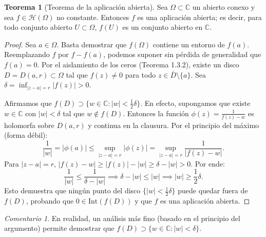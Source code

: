 \documentclass[11pt,a4paper]{article}
\theoremstyle{definition}
\newtheorem{teorema}{Teorema}[section]
\theoremstyle{remark}
\newtheorem{observacion}{Comentario}[section]
\numberwithin{equation}{section}
\begin{document}
\begin{teorema}[Teorema de la aplicación abierta]
Sea $\Omega \subset \mathbb{C}$ un abierto conexo y sea $f \in \mathcal{H}(\Omega)$ no constante. Entonces $f$ es una aplicación abierta; es decir, para todo conjunto abierto $U \subset \Omega$, $f(U)$ es un conjunto abierto en $\mathbb{C}$.
\end{teorema}
\begin{proof}
Sea $a \in \Omega$. Basta demostrar que $f(\Omega)$ contiene un entorno de $f(a)$. Reemplazando $f$ por $f - f(a)$, podemos suponer sin pérdida de generalidad que $f(a) = 0$. Por el aislamiento de los ceros (Teorema 1.3.2), existe un disco $D = D(a,r) \subset \Omega$ tal que $f(z) \neq 0$ para todo $z \in \bar{D} \setminus \{a\}$.
Sea $\delta = \inf_{|z-a|=r} |f(z)| > 0$. 

Afirmamos que $f(D) \supset \{w \in \mathbb{C} : |w| < \frac{1}{2}\delta\}$. En efecto, supongamos que existe $w \in \mathbb{C}$ con $|w| < \delta$ tal que $w \notin f(D)$. Entonces la función $\phi(z) = \frac{1}{f(z)-w}$ es holomorfa sobre $D(a,r)$ y continua en la clausura. Por el principio del máximo (forma débil):
\[
\frac{1}{|w|} = |\phi(a)| \le \sup_{|z-a|=r} |\phi(z)| = \sup_{|z-a|=r} \frac{1}{|f(z)-w|}.
\]
Para $|z-a|=r$, $|f(z)-w| \ge |f(z)| - |w| \ge \delta - |w| > 0$. Por ende:
\[
\frac{1}{|w|} \le \frac{1}{\delta - |w|} \implies \delta - |w| \le |w| \implies |w| \ge \frac{1}{2}\delta.
\]
Esto demuestra que ningún punto del disco $\{|w| < \frac{1}{2}\delta\}$ puede quedar fuera de $f(D)$, probando que $0 \in \mathrm{Int}(f(D))$ y que $f$ es una aplicación abierta.
\end{proof}

\begin{observacion}
En realidad, un análisis más fino (basado en el principio del argumento) permite demostrar que $f(D) \supset \{w \in \mathbb{C} : |w| < \delta\}$.
\end{observacion}
\end{document}

